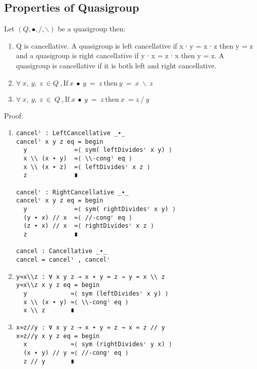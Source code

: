 \subsection{Properties of Quasigroup}
Let $(Q, ∙, /, \backslash)$ be a quasigroup then:
\begin{enumerate}
\item Q is cancellative. A quasigroup is left cancellative if x ∙ y = x ∙ z then
y = z and a quasigroup is right cancellative if y ∙ x = z ∙ x then y = z. A
quasigroup is cancellative if it is both left and right cancellative.
\item \(\forall \ x,\ y,\ z\ \in Q \ ,\text{If} \ x\ ∙\ y\ =\ z\ \text{then}\ y\ =\ x\ \backslash \ z\)
\item \(\forall \ x,\ y,\ z\ \in \ Q \ ,\text{If} \ x\ ∙\ y\ =\ z\ \text{then}\ x\ = z\ /\ y\)
\end{enumerate}
Proof:
\begin{enumerate}
\item 
\begin{verbatim}
cancelˡ : LeftCancellative _∙_
cancelˡ x y z eq = begin
  y             ≈⟨ sym( leftDividesʳ x y) ⟩
  x \\ (x ∙ y)  ≈⟨ \\-congˡ eq ⟩
  x \\ (x ∙ z)  ≈⟨ leftDividesʳ x z ⟩
  z             ∎

cancelʳ : RightCancellative _∙_
cancelʳ x y z eq = begin
  y             ≈⟨ sym( rightDividesʳ x y) ⟩
  (y ∙ x) // x  ≈⟨ //-congʳ eq ⟩
  (z ∙ x) // x  ≈⟨ rightDividesʳ x z ⟩
  z             ∎

cancel : Cancellative _∙_
cancel = cancelˡ , cancelʳ
\end{verbatim}

\item 
\begin{verbatim}
y≈x\\z : ∀ x y z → x ∙ y ≈ z → y ≈ x \\ z
y≈x\\z x y z eq = begin
  y            ≈⟨ sym (leftDividesʳ x y) ⟩
  x \\ (x ∙ y) ≈⟨ \\-congˡ eq ⟩
  x \\ z       ∎
\end{verbatim}

\item 
\begin{verbatim}
x≈z//y : ∀ x y z → x ∙ y ≈ z → x ≈ z // y
x≈z//y x y z eq = begin
  x            ≈⟨ sym (rightDividesʳ y x) ⟩
  (x ∙ y) // y ≈⟨ //-congʳ eq ⟩
  z // y       ∎
\end{verbatim}
\end{enumerate}

